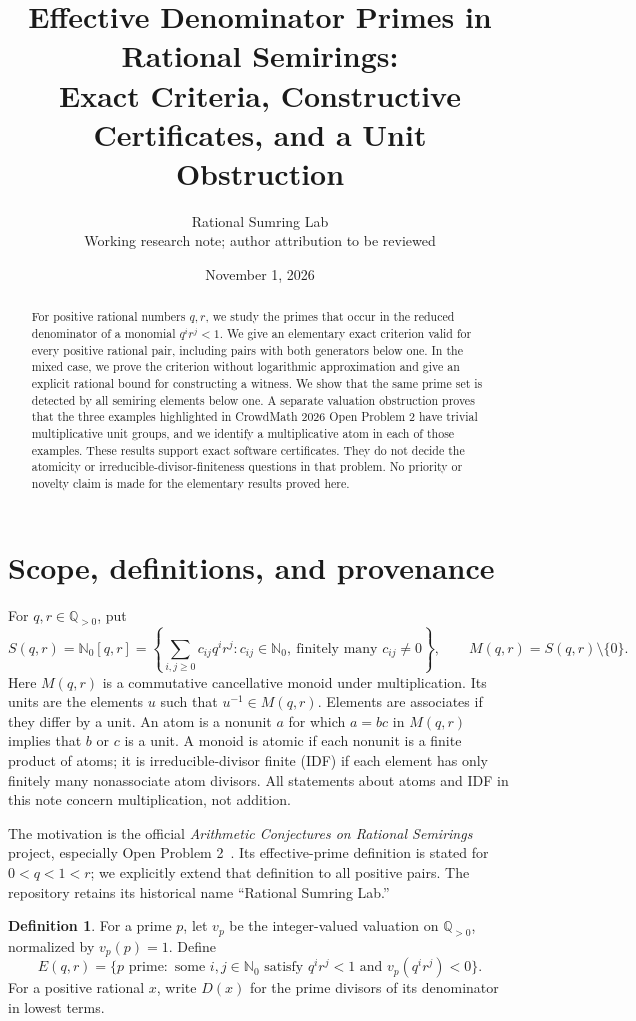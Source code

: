 \documentclass[11pt]{article}
\title{Effective Denominator Primes in Rational Semirings:\\
Exact Criteria, Constructive Certificates, and a Unit Obstruction}
\author{Rational Sumring Lab\\\small Working research note; author attribution to be reviewed}
\date{November 1, 2026}
\theoremstyle{definition}
\newtheorem{definition}[theorem]{Definition}
\newcommand{\NN}{\mathbb N}
\newcommand{\QQ}{\mathbb Q}
\begin{document}
\maketitle
\begin{abstract}
For positive rational numbers $q,r$, we study the primes that occur in the
reduced denominator of a monomial $q^ir^j<1$. We give an elementary exact
criterion valid for every positive rational pair, including pairs with both
generators below one. In the mixed case, we prove the criterion without
logarithmic approximation and give an explicit rational bound for constructing
a witness. We show that the same prime set is detected by all semiring elements
below one. A separate valuation obstruction proves that the three examples
highlighted in CrowdMath 2026 Open Problem 2 have trivial multiplicative unit
groups, and we identify a multiplicative atom in each of those examples.
These results support exact software certificates. They do not decide
the atomicity or irreducible-divisor-finiteness questions in that problem.
No priority or novelty claim is made for the elementary results proved here.
\end{abstract}

\section{Scope, definitions, and provenance}
For $q,r\in\QQ_{>0}$, put
\[
 S(q,r)=\NN_0[q,r]
 =\left\{\sum_{i,j\ge0}c_{ij}q^ir^j:
       c_{ij}\in\NN_0,\ \text{finitely many }c_{ij}\ne0\right\},
 \qquad M(q,r)=S(q,r)\setminus\{0\}.
\]
Here $M(q,r)$ is a commutative cancellative monoid under multiplication.
Its units are the elements $u$ such that $u^{-1}\in M(q,r)$. Elements are
associates if they differ by a unit. An atom is a nonunit $a$ for which
$a=bc$ in $M(q,r)$ implies that $b$ or $c$ is a unit. A monoid is atomic if
each nonunit is a finite product of atoms; it is irreducible-divisor finite
(IDF) if each element has only finitely many nonassociate atom divisors.
All statements about atoms and IDF in this note concern multiplication,
not addition.

The motivation is the official \emph{Arithmetic Conjectures on Rational
Semirings} project, especially Open Problem 2~\cite{cm2}.
Its effective-prime definition is stated for $0<q<1<r$; we explicitly extend
that definition to all positive pairs. The repository retains its historical
name ``Rational Sumring Lab.''

\begin{definition}
For a prime $p$, let $v_p$ be the integer-valued valuation on $\QQ_{>0}$,
normalized by $v_p(p)=1$. Define
\[
 E(q,r)=\{p\text{ prime}:\text{ some }i,j\in\NN_0
       \text{ satisfy }q^ir^j<1\text{ and }v_p(q^ir^j)<0\}.
\]
For a positive rational $x$, write $D(x)$ for the prime divisors of its
denominator in lowest terms.
\end{definition}
\end{document}
